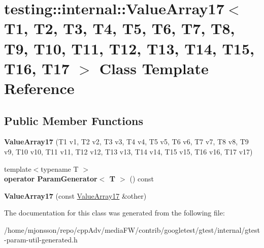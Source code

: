 \hypertarget{classtesting_1_1internal_1_1ValueArray17}{}\section{testing\+:\+:internal\+:\+:Value\+Array17$<$ T1, T2, T3, T4, T5, T6, T7, T8, T9, T10, T11, T12, T13, T14, T15, T16, T17 $>$ Class Template Reference}
\label{classtesting_1_1internal_1_1ValueArray17}
\subsection*{Public Member Functions}
\begin{DoxyCompactItemize}
\item 
\mbox{\label{classtesting_1_1internal_1_1ValueArray17_a943a86a365abde6bdd667e1ad2dbff9b}} 
{\bfseries Value\+Array17} (T1 v1, T2 v2, T3 v3, T4 v4, T5 v5, T6 v6, T7 v7, T8 v8, T9 v9, T10 v10, T11 v11, T12 v12, T13 v13, T14 v14, T15 v15, T16 v16, T17 v17)
\item 
\mbox{\label{classtesting_1_1internal_1_1ValueArray17_a31189716b99483febb83ae7436cd3f6f}} 
{\footnotesize template$<$typename T $>$ }\\{\bfseries operator Param\+Generator$<$ T $>$} () const
\item 
\mbox{\label{classtesting_1_1internal_1_1ValueArray17_a20233ef4958a1b16ec7a8c004f1604fb}} 
{\bfseries Value\+Array17} (const \hyperlink{classtesting_1_1internal_1_1ValueArray17}{Value\+Array17} \&other)
\end{DoxyCompactItemize}


The documentation for this class was generated from the following file\+:\begin{DoxyCompactItemize}
\item 
/home/mjonsson/repo/cpp\+Adv/media\+F\+W/contrib/googletest/gtest/internal/gtest-\/param-\/util-\/generated.\+h\end{DoxyCompactItemize}
